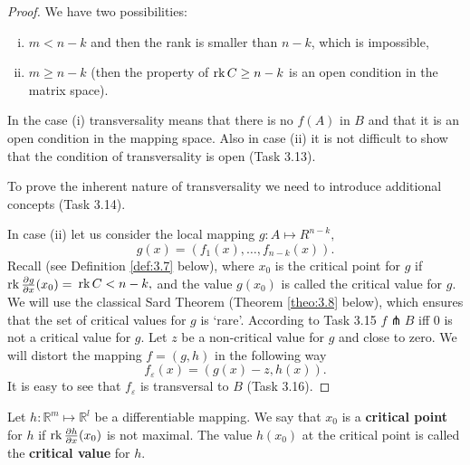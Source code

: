 \begin{theorem}
\begin{proof}
		We have two possibilities:
		\begin{enumerate}[(i)]
			\item $m<n-k$ and then the rank is smaller than $n-k$, which is impossible,
			\item $m\geq n-k$ (then the property of $\textrm{rk\,} C\geq n-k$ is an open condition in the matrix space).
		\end{enumerate}
	In the case (i) transversality means that there is no $f (A)$ in $B$ and that it is an open condition in the mapping space. Also in case (ii) it is not difficult to show that the condition of transversality is open (Task 3.13).
	
	To prove the inherent nature of transversality we need to introduce additional concepts (Task 3.14).
	
	In case (ii) let us consider the local mapping $g:A\longmapsto R^{n-k},$%
	$$
	g(x)=(f_{1}(x),\ldots ,f_{n-k}(x)).
	$$	
	Recall (see Definition \ref{def:3.7} below), where $x_0$ is the critical point for $g$ if $\textrm{rk\,} \frac{\partial g}{\partial x}(x_{0}) = $ $\textrm{rk\,} C<n-k,$ and the value $g (x_0)$ is called the critical value for $g$. We will use the classical Sard Theorem (Theorem \ref{theo:3.8} below), which ensures that the set of critical values for $g$ is `rare'. According to Task 3.15 $f\pitchfork B$ iff 0 is not a critical value for $g$. Let $z$ be a non-critical value for $g$ and close to zero. We will distort the mapping $f=(g,h)$ in the following way
	$$
	f_{\varepsilon }(x)=(g(x)-z,h(x)).
	$$
	It is easy to see that $f_{\varepsilon }$ is transversal to $B$ (Task 3.16).
	\end{proof}
\end{theorem}

\begin{definition}\label{def:3.7}
	Let $h:\mathbb{R}^{m}\longmapsto \mathbb{R}^{l}$ be a differentiable mapping. We say that $x_0$ is a \textbf{critical point} for $h$ if $\textrm{rk\,} \frac{\partial h}{\partial x}(x_{0})$ is not maximal. The value $h(x_0)$ at the critical point is called the \textbf{critical value} for $h$.
\end{definition}

